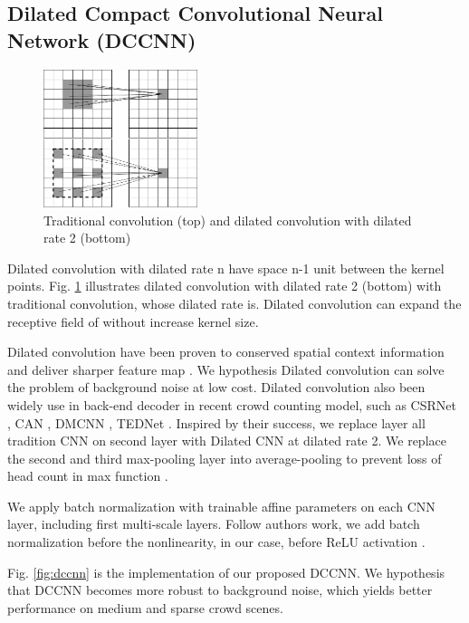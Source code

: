\subsection{Dilated Compact Convolutional Neural Network (DCCNN)} 

\begin{figure}[htbp]
\centerline{\includegraphics[width=0.4\textwidth]{Picture/example/cnn_vs_dilated_cnn.png}}
\caption{Traditional convolution (top) and dilated convolution with dilated rate 2 (bottom)}
\label{fig:cnn_vs_dilated}
\end{figure}

Dilated convolution with dilated rate n have space n-1 unit between the kernel points. Fig. \ref{fig:cnn_vs_dilated} illustrates dilated convolution with dilated rate 2 (bottom) with traditional convolution, whose dilated rate is. Dilated convolution can expand the receptive field of without increase kernel size.

Dilated convolution have been proven to conserved spatial context information  and deliver sharper feature map \cite{li2018csrnet}. We hypothesis Dilated convolution can solve the problem of background noise at low cost. Dilated convolution also been widely use in back-end decoder in recent crowd counting model, such as CSRNet \cite{li2018csrnet}, CAN \cite{liu2019context}, DMCNN \cite{zhang2019crowd}, TEDNet \cite{jiang2019crowd}. Inspired by their success, we replace layer all tradition CNN on second layer with Dilated CNN at dilated rate 2. We replace the second and third max-pooling layer into average-pooling to prevent loss of head count in max function \cite{zhang2019crowd}. 

We apply batch normalization \cite{ioffe2015batch} with trainable affine parameters on each CNN layer, including first multi-scale layers. Follow authors work, we add batch normalization before the nonlinearity, in our case, before ReLU activation \cite{agarap2018deep}. 

Fig. \ref{fig:dccnn} is the implementation of our proposed DCCNN.  We hypothesis that DCCNN becomes more robust to background noise, which yields better performance on medium and sparse crowd scenes. 


